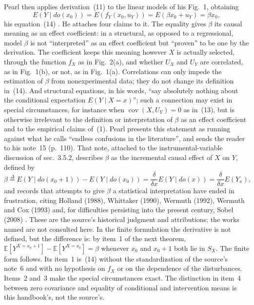 Pearl then applies derivation~(11) to the linear models of his Fig.~1,
obtaining
\[
 E(Y\mid do(x_0))=E(f_Y(x_0,u_Y))=E(\beta x_0+u_Y)=\beta x_0,
\]
his equation~(14) \cite[sec.~3.2.2, p.~110]{Pearl2009CausalOverview}.
He attaches four claims to it. The equality gives \(\beta\) its causal
meaning as an effect coefficient: in a structural, as opposed to a
regressional, model \(\beta\) is not ``interpreted'' as an effect
coefficient but ``proven'' to be one by the derivation. The coefficient
keeps this meaning however \(X\) is actually selected, through the
function \(f_X\) as in Fig.~2(a), and whether \(U_X\) and \(U_Y\) are
correlated, as in Fig.~1(b), or not, as in Fig.~1(a). Correlations can
only impede the estimation of \(\beta\) from nonexperimental data; they do
not change its definition in~(14). And structural equations, in his words,
``say absolutely nothing about the conditional expectation
\(E(Y\mid X=x)\)''; such a connection may exist in special circumstances,
for instance when \(\operatorname{cov}(X,U_Y)=0\) as in~(13), but is
otherwise irrelevant to the definition or interpretation of \(\beta\) as
an effect coefficient and to the empirical claims of~(1). Pearl presents
this statement as running against what he calls ``endless confusions in
the literature'', and sends the reader to his note~15 (p.~110). That note,
attached to the instrumental-variable discussion of sec.~3.5.2, describes
\(\beta\) as the incremental causal effect of \(X\) on \(Y\), defined by
\[
 \beta\mathrel{\stackrel{\Delta}{=}}E(Y\mid do(x_0+1))-E(Y\mid do(x_0))
 =\frac{\delta}{\delta x}E(Y\mid do(x))=\frac{\delta}{\delta x}E(Y_x),
\]
and records that attempts to give \(\beta\) a statistical interpretation
have ended in frustration, citing Holland (1988), Whittaker (1990),
Wermuth (1992), Wermuth and Cox (1993) and, for difficulties persisting
into the present century, Sobel (2008)
\cite[sec.~3.5.2, p.~124, n.~15]{Pearl2009CausalOverview}. These are the
source's historical judgment and attributions; the works named are not
consulted here. In the finite formulation the derivative is not defined,
but the difference is: by item~1 of the next theorem,
\(\mathbb E[Y^{X=x_0+1}]-\mathbb E[Y^{X=x_0}]=\beta\) whenever \(x_0\) and
\(x_0+1\) both lie in \(S_X\). The finite form follows. Its item~1 is~(14) without the standardization of the source's
note~6 and with no hypothesis on \(f_X\) or on the dependence of the
disturbances. Items~2 and~3 make the special circumstances exact. The
distinction in item~4 between zero covariance and equality of conditional
and intervention means is this handbook's, not the source's.

